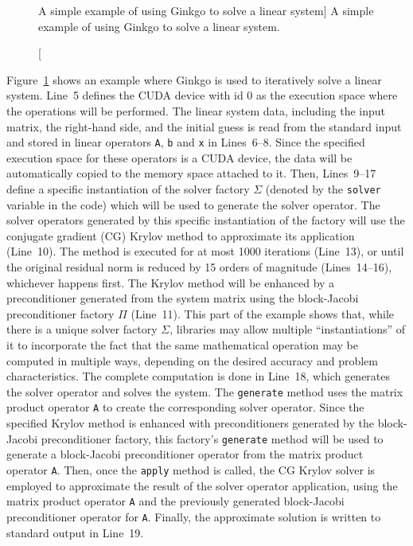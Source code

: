 \begin{figure}
\begin{center}

\end{center}
\caption
[A simple example of using Ginkgo to solve a linear system]
{A simple example of using Ginkgo to solve a linear system.}
\label{conclusion:fig:ginkgo-example}
\end{figure}

Figure~\ref{conclusion:fig:ginkgo-example} shows an example where Ginkgo is used
to iteratively solve a linear system. Line~5 defines the CUDA device with id 0
as the execution space where the operations will be performed. The linear system
data, including the input matrix, the right-hand side, and the initial guess is
read from the standard input and stored in linear operators \texttt{A},
\texttt{b} and \texttt{x} in Lines~6--8. Since the specified execution space for
these operators is a CUDA device, the data will be automatically copied to the
memory space attached to it. Then, Lines~9--17 define a specific instantiation
of the solver factory $\Sigma$ (denoted by the \texttt{solver} variable in the
code) which will be used to generate the solver operator. The solver operators
generated by this specific instantiation of the factory will use the conjugate
gradient (CG) Krylov method to approximate its application (Line~10). The method
is executed for at most 1000 iterations (Line~13), or until the original
residual norm is reduced by 15 orders of magnitude (Lines~14--16), whichever
happens first. The Krylov method will be enhanced by a preconditioner generated
from the system matrix using the block-Jacobi preconditioner factory $\Pi$
(Line~11). This part of the example shows that, while there is a unique solver
factory $\Sigma$, libraries may allow multiple ``instantiations'' of it to
incorporate the fact that the same mathematical operation may be computed in
multiple ways, depending on the desired accuracy and problem characteristics.
The complete computation is done in Line~18, which generates the solver operator
and solves the system. The \texttt{generate} method uses the matrix product
operator \texttt{A} to create the corresponding solver operator.  Since the
specified Krylov method is enhanced with preconditioners generated by the
block-Jacobi preconditioner factory, this factory's \texttt{generate} method
will be used to generate a block-Jacobi preconditioner operator from the matrix
product operator \texttt{A}. Then, once the \texttt{apply} method is called, the
CG Krylov solver is employed to approximate the result of the solver operator
application, using the matrix product operator \texttt{A} and the previously
generated block-Jacobi preconditioner operator for \texttt{A}.  Finally, the
approximate solution is written to standard output in Line~19.
